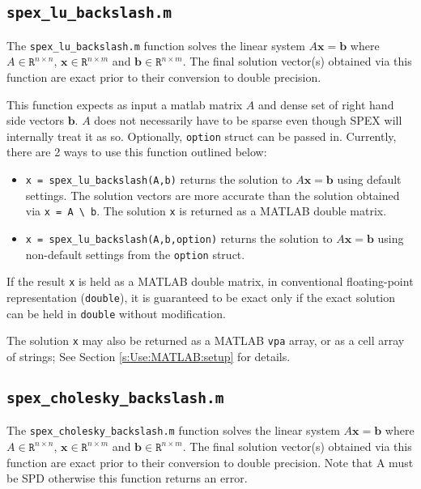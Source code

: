 \documentclass[12pt,oneside]{book}
\theoremstyle{definition}
\renewcommand{\b}{\mathbf{b}}
\newcommand{\x}{\mathbf{x}}
\begin{document}
\subsection{\texttt{spex\_lu\_backslash.m}}
The \verb|spex_lu_backslash.m| function solves the linear system $A \x = \b$ where
$A \in \mathtt{R}^{n \times n}$, $\x \in \mathtt{R}^{n \times m}$ and $\b \in
\mathtt{R}^{n \times m}$. The final solution vector(s) obtained via this
function are exact prior to their conversion to double precision.

This function expects as input a matlab matrix $A$ and dense set of
right hand side vectors $\b$. $A$ does not necessarily have to be sparse
even though SPEX will internally treat it as so. Optionally, \verb|option| 
struct can be passed in.
Currently, there are 2 ways to use this function outlined below:

\begin{itemize}

\item \verb|x = spex_lu_backslash(A,b)| returns the solution to $A \x =
\b$ using default settings. The solution vectors are more accurate than
the solution obtained via \verb|x = A \ b|.  The solution \verb|x| is
returned as a MATLAB double matrix.

\item \verb|x = spex_lu_backslash(A,b,option)| returns the solution to $A \x =
\b$ using non-default settings from the \verb|option| struct.

\end{itemize}

If the result \verb|x| is held as a MATLAB double matrix, in conventional
floating-point representation (\verb|double|), it is guaranteed to be exact
only if the exact solution can be held in \verb|double| without modification.

The solution \verb|x| may also be returned as a MATLAB \verb|vpa| array, or as
a cell array of strings; See Section \ref{s:Use:MATLAB:setup} for details.


\subsection{\texttt{spex\_cholesky\_backslash.m}}
The \verb|spex_cholesky_backslash.m| function solves the linear system $A \x = \b$ where
$A \in \mathtt{R}^{n \times n}$, $\x \in \mathtt{R}^{n \times m}$ and $\b \in
\mathtt{R}^{n \times m}$. The final solution vector(s) obtained via this
function are exact prior to their conversion to double precision. Note that
A must be SPD otherwise this function returns an error.
\end{document}
